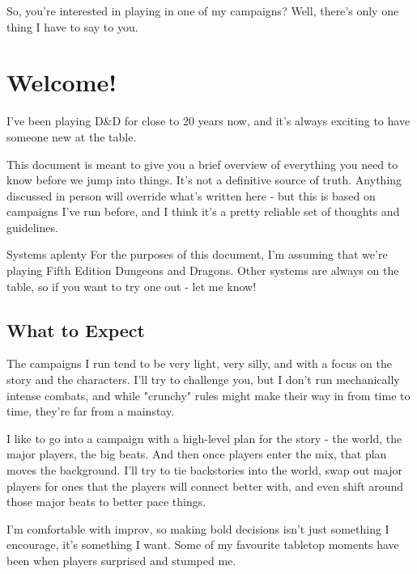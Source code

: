 \maketitle

So, you're interested in playing in one of my campaigns? Well, there's only one thing I have to say to you.

\section{Welcome!}

I've been playing D\&D for close to 20 years now, and it's always exciting to have someone new at the table.

This document is meant to give you a brief overview of everything you need to know before we jump into things. It's not a definitive source of truth. Anything discussed in person will override what's written here - but this is based on campaigns I've run before, and I think it's a pretty reliable set of thoughts and guidelines.

\begin{DndComment}{Systems aplenty}
 For the purposes of this document, I'm assuming that we're playing Fifth Edition Dungeons and Dragons. Other systems are always on the table, so if you want to try one out - let me know!
\end{DndComment}

\subsection{What to Expect}

The campaigns I run tend to be very light, very silly, and with a focus on the story and the characters. I'll try to challenge you, but I don't run mechanically intense combats, and while "crunchy" rules might make their way in from time to time, they're far from a mainstay.

I like to go into a campaign with a high-level plan for the story - the world, the major players, the big beats. And then once players enter the mix, that plan moves the background. I'll try to tie backstories into the world, swap out major players for ones that the players will connect better with, and even shift around those major beats to better pace things.

I'm comfortable with improv, so making bold decisions isn't just something I encourage, it's something I want. Some of my favourite tabletop moments have been when players surprised and stumped me.

